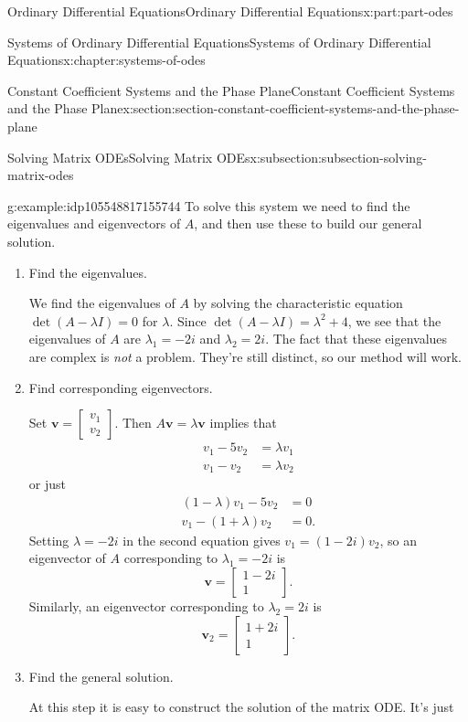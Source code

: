\documentclass[twoside,10pt,]{book}
\numberwithin{equation}{part}
\renewcommand{\vec}[1]{\mathbf{#1}}
\newcommand{\amp}{&}
\begin{document}
\begin{partptx}{Ordinary Differential Equations}{}{Ordinary Differential Equations}{}{}{x:part:part-odes}
\begin{chapterptx}{Systems of Ordinary Differential Equations}{}{Systems of Ordinary Differential Equations}{}{}{x:chapter:systems-of-odes}
\begin{sectionptx}{Constant Coefficient Systems and the Phase Plane}{}{Constant Coefficient Systems and the Phase Plane}{}{}{x:section:section-constant-coefficient-systems-and-the-phase-plane}
\begin{subsectionptx}{Solving Matrix ODEs}{}{Solving Matrix ODEs}{}{}{x:subsection:subsection-solving-matrix-odes}
\begin{example}{}{g:example:idp105548817155744}
To solve this system we need to find the eigenvalues and eigenvectors of \(A\), and then use these to build our general solution.%
\begin{enumerate}
\item{}Find the eigenvalues.%
\par
We find the eigenvalues of \(A\) by solving the characteristic equation \(\det(A - \lambda I) = 0\) for \(\lambda\). Since \(\det(A - \lambda I) = \lambda^{2}+4\), we see that the eigenvalues of \(A\) are \(\lambda_{1} = -2i\) and \(\lambda_{2} = 2i\). The fact that these eigenvalues are complex is \emph{not} a problem. They're still distinct, so our method will work.%
\item{}Find corresponding eigenvectors.%
\par
Set \(\vec{v} = \begin{bmatrix}v_{1} \\ v_{2}\end{bmatrix}\). Then \(A\vec{v} = \lambda\vec{v}\) implies that%
\begin{align*}
v_{1} - 5v_{2}  \amp =  \lambda v_{1}\\
v_{1} -v_{2}  \amp =  \lambda v_{2}
\end{align*}
or just%
\begin{align*}
(1-\lambda)v_{1} - 5v_{2} \amp =0\\
v_{1} - (1+\lambda)v_{2} \amp = 0.
\end{align*}
Setting \(\lambda=-2i\) in the second equation gives \(v_{1} = (1-2i)v_{2}\), so an eigenvector of \(A\) corresponding to \(\lambda_{1} = -2i\) is%
\begin{equation*}
\vec{v} = \begin{bmatrix}1-2i \\ 1\end{bmatrix}.
\end{equation*}
Similarly, an eigenvector corresponding to \(\lambda_{2}=2i\) is%
\begin{equation*}
\vec{v}_{2} = \begin{bmatrix}1+2i\\1\end{bmatrix}.
\end{equation*}
%
\item{}Find the general solution.%
\par
At this step it is easy to construct the solution of the matrix ODE. It's just%
\begin{equation*}

\end{equation*}
\end{enumerate}
\end{example}
\end{subsectionptx}
\end{sectionptx}
\end{chapterptx}
\end{partptx}
\end{document}
